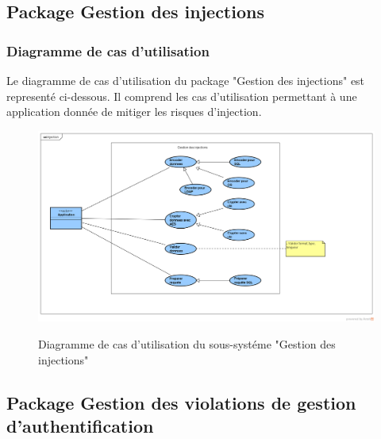 \subsection{Package Gestion des injections}

\subsubsection{Diagramme de cas d'utilisation}
Le diagramme de cas d'utilisation du package "Gestion des injections" est representé ci-dessous. Il comprend les cas d'utilisation permettant à une application donnée de mitiger les risques d'injection.\\ 
\begin{figure}[h!]
	\centering
	\begin{minipage}{12cm}
		\centering
		{\includegraphics[height=0.27\textheight]{fig/Injection-use-case-diagram.png}}
	\end{minipage}
	\caption{Diagramme de cas d'utilisation du sous-systéme "Gestion des injections"}
	\label{fig:8.1}
\end{figure}

\subsection{Package Gestion des violations de gestion d'authentification}

